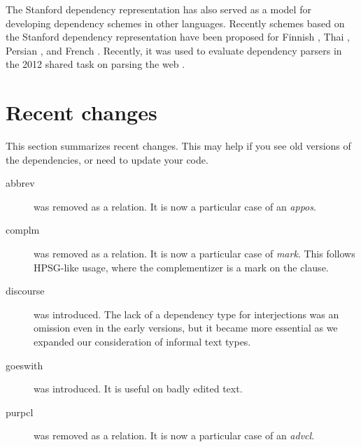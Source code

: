 \documentclass[11pt,letter]{article}
\begin{document}
The Stanford dependency representation has also served as a model for
developing dependency schemes in other languages. Recently schemes
based on the Stanford dependency representation have been proposed for
Finnish \citep{Haverinen2010a,Haverinen2010b}, Thai \citep{Potisuk10},
Persian \citep{Seraji12}, and French \citep{Maarouf12}. Recently, it
was used to evaluate dependency parsers in the 2012 shared task on parsing the web \citep{Petrov12}.

\section{Recent changes}

This section summarizes recent changes. This may help if you see old
versions of the dependencies, or need to update your code.

\begin{description}
\item[abbrev] was removed as a relation.  It is now a particular case
  of an \emph{appos}.
\item[complm] was removed as a relation. It is now a particular case of
  \emph{mark}. This follows HPSG-like usage, where the complementizer
  is a mark on the clause.
\item[discourse] was introduced. The lack of a dependency type for
  interjections was an omission even in the early versions, but it
  became more essential as we expanded our consideration of informal
  text types.
\item[goeswith] was introduced. It is useful on badly edited text.
\item[purpcl] was removed as a relation. It is now a particular case
  of an \emph{advcl}.
\end{description}




\end{document}
